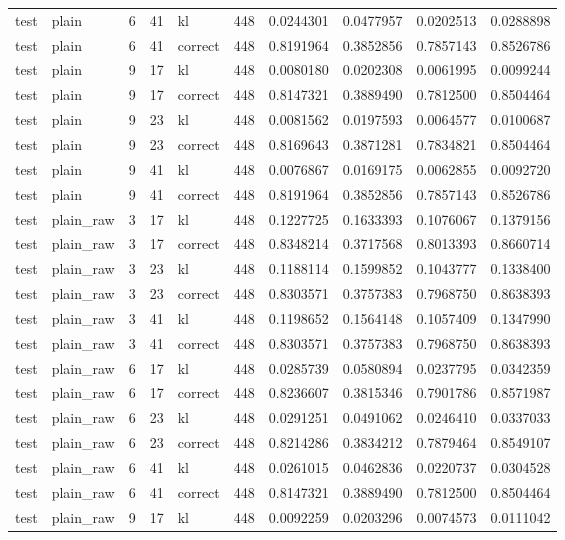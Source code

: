 \begin{tabular}{llrrlrrrrr}
test & plain & 6 & 41 & kl & 448 & 0.0244301 & 0.0477957 & 0.0202513 & 0.0288898 \\
test & plain & 6 & 41 & correct & 448 & 0.8191964 & 0.3852856 & 0.7857143 & 0.8526786 \\
test & plain & 9 & 17 & kl & 448 & 0.0080180 & 0.0202308 & 0.0061995 & 0.0099244 \\
test & plain & 9 & 17 & correct & 448 & 0.8147321 & 0.3889490 & 0.7812500 & 0.8504464 \\
test & plain & 9 & 23 & kl & 448 & 0.0081562 & 0.0197593 & 0.0064577 & 0.0100687 \\
test & plain & 9 & 23 & correct & 448 & 0.8169643 & 0.3871281 & 0.7834821 & 0.8504464 \\
test & plain & 9 & 41 & kl & 448 & 0.0076867 & 0.0169175 & 0.0062855 & 0.0092720 \\
test & plain & 9 & 41 & correct & 448 & 0.8191964 & 0.3852856 & 0.7857143 & 0.8526786 \\
test & plain_raw & 3 & 17 & kl & 448 & 0.1227725 & 0.1633393 & 0.1076067 & 0.1379156 \\
test & plain_raw & 3 & 17 & correct & 448 & 0.8348214 & 0.3717568 & 0.8013393 & 0.8660714 \\
test & plain_raw & 3 & 23 & kl & 448 & 0.1188114 & 0.1599852 & 0.1043777 & 0.1338400 \\
test & plain_raw & 3 & 23 & correct & 448 & 0.8303571 & 0.3757383 & 0.7968750 & 0.8638393 \\
test & plain_raw & 3 & 41 & kl & 448 & 0.1198652 & 0.1564148 & 0.1057409 & 0.1347990 \\
test & plain_raw & 3 & 41 & correct & 448 & 0.8303571 & 0.3757383 & 0.7968750 & 0.8638393 \\
test & plain_raw & 6 & 17 & kl & 448 & 0.0285739 & 0.0580894 & 0.0237795 & 0.0342359 \\
test & plain_raw & 6 & 17 & correct & 448 & 0.8236607 & 0.3815346 & 0.7901786 & 0.8571987 \\
test & plain_raw & 6 & 23 & kl & 448 & 0.0291251 & 0.0491062 & 0.0246410 & 0.0337033 \\
test & plain_raw & 6 & 23 & correct & 448 & 0.8214286 & 0.3834212 & 0.7879464 & 0.8549107 \\
test & plain_raw & 6 & 41 & kl & 448 & 0.0261015 & 0.0462836 & 0.0220737 & 0.0304528 \\
test & plain_raw & 6 & 41 & correct & 448 & 0.8147321 & 0.3889490 & 0.7812500 & 0.8504464 \\
test & plain_raw & 9 & 17 & kl & 448 & 0.0092259 & 0.0203296 & 0.0074573 & 0.0111042 \\

\end{tabular}
